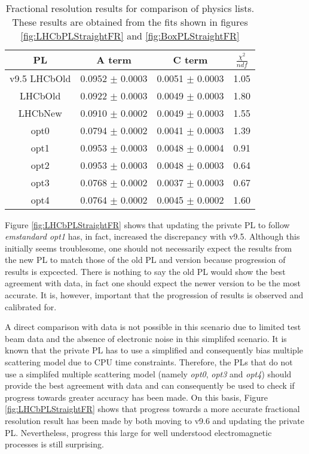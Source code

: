 \begin{table}[h]
  \centering
  \begin{tabular}{|c|c|c|c|}
      \hline
      PL & A term & C term & $\frac{\chi^2}{ndf}$  \\ \hline
      v9.5 LHCbOld & 0.0952 $\pm$ 0.0003 & 0.0051 $\pm$ 0.0003 & 1.05 \\ \hline
      LHCbOld & 0.0922 $\pm$ 0.0003 & 0.0049 $\pm$ 0.0003 & 1.80 \\ \hline 
      LHCbNew & 0.0910 $\pm$ 0.0002 & 0.0049 $\pm$ 0.0003 & 1.55 \\ \hline
      opt0 & 0.0794 $\pm$ 0.0002 & 0.0041 $\pm$ 0.0003 & 1.39 \\ \hline
      opt1 & 0.0953 $\pm$ 0.0003 & 0.0048 $\pm$ 0.0004 & 0.91 \\ \hline
      opt2 & 0.0953 $\pm$ 0.0003 & 0.0048 $\pm$ 0.0003 & 0.64 \\ \hline 
      opt3 & 0.0768 $\pm$ 0.0002 & 0.0037 $\pm$ 0.0003 & 0.67 \\ \hline 
      opt4 & 0.0764 $\pm$ 0.0002 & 0.0045 $\pm$ 0.0002 & 1.60 \\ \hline
  \end{tabular}
  \caption{Fractional resolution results for comparison of \geant physics lists.  These results are obtained from the fits shown in figures \ref{fig:LHCbPLStraightFR} and \ref{fig:BoxPLStraightFR}}
  \label{tab:results}
\end{table}

Figure \ref{fig:LHCbPLStraightFR} shows that updating the \lhcb private PL to follow \textit{emstandard opt1} has, in fact, increased the discrepancy with v9.5.  Although this initially seems troublesome, one should not necessarily expect the results from the new PL to match those of the old PL and \geant version because progression of results is expcected.  There is nothing to say the old PL would show the best agreement with data, in fact one should expect the newer version to be the most accurate.  It is, however, important that the progression of results is observed and calibrated for.

A direct comparison with data is not possible in this scenario due to limited test beam data and the absence of electronic noise in this simplifed scenario.   It is known that the \lhcb private PL has to use a simplified and consequently bias multiple scattering model due to CPU time constraints.  Therefore, the PLs that do not use a simplifed multiple scattering model (namely \textit{opt0}, \textit{opt3} and \textit{opt4}) should provide the best agreement with data and can consequently be used to check if progress towards greater accuracy has been made.  On this basis, Figure \ref{fig:LHCbPLStraightFR} shows that progress towards a more accurate fractional resolution result has been made by both moving to \geant v9.6 and updating the \lhcb private PL. Nevertheless, progress this large for well understood electromagnetic processes is still surprising.

